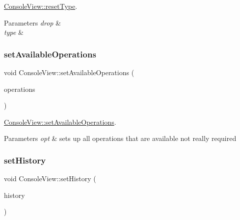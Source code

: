 \hyperlink{class_console_view_aba1141da17dd4f424ae296142ff7a8bd}{Console\+View\+::reset\+Type}. 


\begin{DoxyParams}{Parameters}
{\em drop} & \\
\hline
{\em type} & \\
\hline
\end{DoxyParams}
\mbox{\label{class_console_view_a6d88d3e3957fb1cdea6e076770fffdec}} 
\subsubsection{\texorpdfstring{set\+Available\+Operations}{setAvailableOperations}}
{\footnotesize\ttfamily void Console\+View\+::set\+Available\+Operations (\begin{DoxyParamCaption}\item[{const Q\+Vector$<$ Q\+String $>$}]{operations }\end{DoxyParamCaption})\hspace{0.3cm}{\ttfamily [slot]}}



\hyperlink{class_console_view_a6d88d3e3957fb1cdea6e076770fffdec}{Console\+View\+::set\+Available\+Operations}. 


\begin{DoxyParams}{Parameters}
{\em opt} & sets up all operations that are available not really required \\
\hline
\end{DoxyParams}
\mbox{\label{class_console_view_acd2e5ae5d77096c4227c2c9c5881926b}} 
\subsubsection{\texorpdfstring{set\+History}{setHistory}}
{\footnotesize\ttfamily void Console\+View\+::set\+History (\begin{DoxyParamCaption}\item[{const Q\+Vector$<$ Q\+Vector$<$ Q\+String $>$$>$ \&}]{history }\end{DoxyParamCaption})\hspace{0.3cm}{\ttfamily [slot]}}



